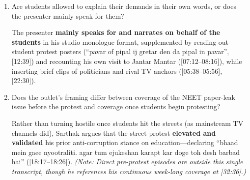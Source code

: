 \documentclass[10pt,a4paper]{article}
\begin{document}
{\begin{enumerate}[leftmargin=1.5em, itemsep=6pt, topsep=4pt]
  \item Are students allowed to explain their demands in their own words, or does the presenter mainly speak for them?\par\smallskip
  The presenter \textbf{mainly speaks for and narrates on behalf of the students} in his studio monologue format, supplemented by reading out student protest posters (``pavar of pipal ij gretar den da pipal in pavar'', [12:39]) and recounting his own visit to Jantar Mantar ([07:12--08:16]), while inserting brief clips of politicians and rival TV anchors ([05:38--05:56], [22:30]).
  \item Does the outlet's framing differ between coverage of the NEET paper-leak issue before the protest and coverage once students begin protesting?\par\smallskip
  Rather than turning hostile once students hit the streets (as mainstream TV channels did), Sarthak argues that the street protest \textbf{elevated and validated} his prior anti-corruption stance on education---declaring ``bhaad mein gaee nyootraliti. agar tum ejukeshan karapt kar doge toh desh barbad hai'' ([18:17--18:26]). \emph{(Note: Direct pre-protest episodes are outside this single transcript, though he references his continuous week-long coverage at [32:36].)}
\end{enumerate}
}
\end{document}
